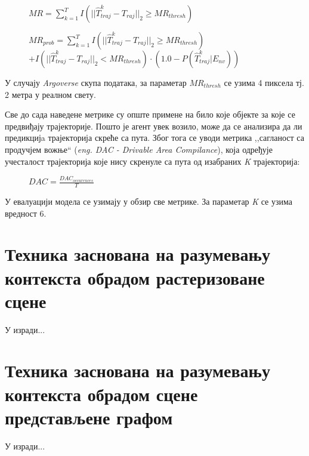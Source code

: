 \documentclass[11pt,oneside]{memoir}
\begin{document}
\begin{figure}[h!]
  \centering
  $MR = \sum^T_{k=1} I(||\hat{T}^{k}_{traj} - T_{raj}||_{2} \geq MR_{thresh})$
\end{figure}

\begin{figure}[h!]
  \centering
  $MR_{prob} = \sum^T_{k=1} I(||\hat{T}^{k}_{traj} - T_{raj}||_{2} \geq MR_{thresh}) $
  $+ I(||\hat{T}^{k}_{traj} - T_{raj}||_{2} < MR_{thresh}) \cdot (1.0 - P(\hat{T}^{k}_{traj}|E_{nv}))$
\end{figure}

\noindent У случају \textit{Argoverse} скупа података, за параметар $MR_{thresh}$ се узима 4 пиксела тј. 2 метра у реалном свету. 

Све до сада наведене метрике су опште примене на било које објекте за које се предвиђају трајекторије. Пошто је агент увек возило, може да
се анализира да ли предикцијa трајекторија скреће са пута. Због тога се уводи метрика ,,сагланост са продучјем вожње`` 
(\textit{eng. DAC - Drivable Area Compilance}), која одређује учесталост трајекторија које нису скренуле са пута од изабраних 
\textit{K} трајекторија: \cite{argoverse}

\begin{figure}[h!]
  \centering
  $DAC = \frac{DAC_{occurences}}{T}$
\end{figure}

У евалуацији модела се узимају у обзир све метрике. За параметар \textit{K} се узима вредност 6.

\chapter{Техника заснована на разумевању контекста обрадом растеризоване сцене}
\label{chp:razrada}

У изради...

\chapter{Техника заснована на разумевању контекста обрадом сцене представљене графом}
\label{chp:razrada}

У изради...
\end{document}

